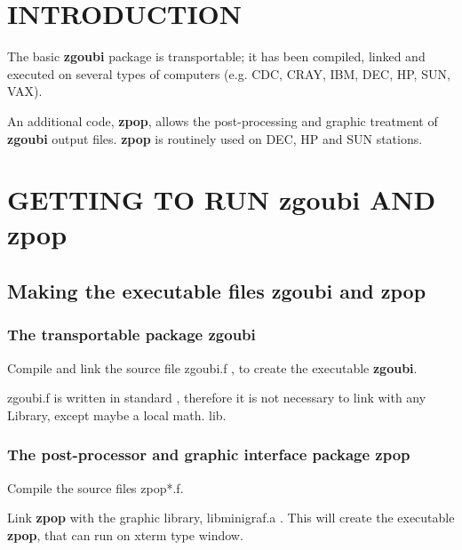  \clearemptydoublepage

    
\section*{INTRODUCTION} %

The basic \textbf{zgoubi} \FORTRAN package is transportable; it has been
compiled, linked and executed on several types of computers (e.g. 
CDC, CRAY, IBM, DEC, HP, SUN, 
VAX).  
\bigskip

\noindent An additional \FORTRAN code, \textbf{zpop},
allows the post-processing and graphic treatment of \textbf{zgoubi} output 
files. \textbf{zpop} is routinely used on DEC, HP and SUN stations.
\bigskip

\section{GETTING TO RUN zgoubi AND zpop} %

\subsection{Making the executable files zgoubi and zpop}

\subsubsection{The transportable package zgoubi}

Compile and link the \FORTRAN source file zgoubi.f , to create the 
executable \textbf{zgoubi}.
\bigskip

\noindent zgoubi.f is  written in standard 
\FORTRAN, therefore it is not necessary to link with any Library, 
except maybe a local math. lib.  

\subsubsection{The post-processor and graphic interface package zpop} 

Compile  the  \FORTRAN source files zpop*.f. 
\bigskip


\noindent Link \textbf{zpop} with the graphic library, libminigraf.a 
\cite{HAMEL}. This will create the executable \textbf{zpop}, that can run on 
xterm type window. 
\bigskip

